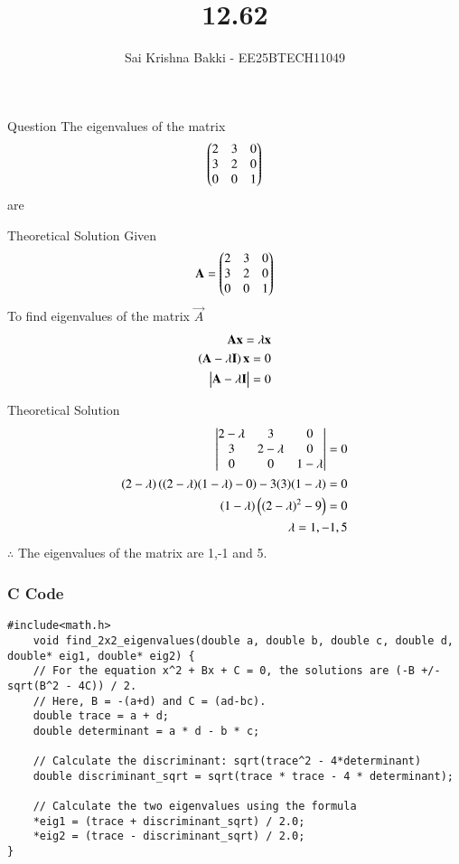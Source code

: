 \documentclass{beamer}
\title %
{12.62}
\date{}
\author %
{Sai Krishna Bakki - EE25BTECH11049}
\begin{document}
\frame{\titlepage}
\begin{frame}{Question}
The eigenvalues of the matrix 
\begin{align*}
    \begin{pmatrix}2&3&0\\3&2&0\\0&0&1\end{pmatrix}
\end{align*}
are
\end{frame}
\begin{frame}{Theoretical Solution}
    Given\\
\begin{align}
    \mathbf{A}=\begin{pmatrix}2&3&0\\3&2&0\\0&0&1\end{pmatrix}
\end{align}
To find eigenvalues of the matrix $\vec{A}$
\begin{align}
    \mathbf{A}\mathbf{x}=\lambda\mathbf{x}\\
    \left(\mathbf{A}-\lambda\mathbf{I}\right)\mathbf{x}=0\\
    \begin{vmatrix}\mathbf{A}-\lambda\mathbf{I}\end{vmatrix}=0
    \end{align}
\end{frame}
\begin{frame}{Theoretical Solution}
\begin{align}
    \begin{vmatrix}2-\lambda&3&0\\3&2-\lambda&0\\0&0&1-\lambda\end{vmatrix}=0\\
    (2-\lambda)\left((2-\lambda)(1-\lambda)-0\right)-3(3)(1-\lambda)=0\\
    (1-\lambda)\left((2-\lambda)^2-9\right)=0\\
    \lambda=1,-1,5
\end{align}
$\therefore$ The eigenvalues of the matrix are 1,-1 and 5.
\end{frame}
\begin{frame}[fragile]
\frametitle{C Code}
\begin{lstlisting}
#include<math.h>
    void find_2x2_eigenvalues(double a, double b, double c, double d, double* eig1, double* eig2) {
    // For the equation x^2 + Bx + C = 0, the solutions are (-B +/- sqrt(B^2 - 4C)) / 2.
    // Here, B = -(a+d) and C = (ad-bc).
    double trace = a + d;
    double determinant = a * d - b * c;

    // Calculate the discriminant: sqrt(trace^2 - 4*determinant)
    double discriminant_sqrt = sqrt(trace * trace - 4 * determinant);

    // Calculate the two eigenvalues using the formula
    *eig1 = (trace + discriminant_sqrt) / 2.0;
    *eig2 = (trace - discriminant_sqrt) / 2.0;
}
\end{lstlisting}    
\end{frame}
\end{document}
